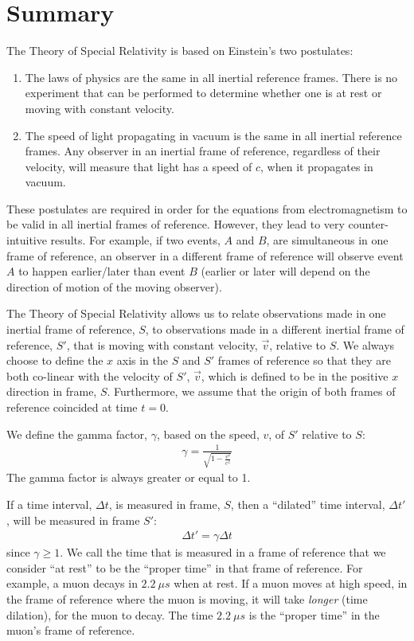 \section{Summary}
\vspace{2cm}
\begin{chapterSummary}
The Theory of Special Relativity is based on Einstein's two postulates:
\begin{enumerate}
\item The laws of physics are the same in all inertial reference frames. There is no experiment that can be performed to determine whether one is at rest or moving with constant velocity.
\item The speed of light propagating in vacuum is the same in all inertial reference frames. Any observer in an inertial frame of reference, regardless of their velocity, will measure that light has a speed of $c$, when it propagates in vacuum. 
\end{enumerate}
These postulates are required in order for the equations from electromagnetism to be valid in all inertial frames of reference. However, they lead to very counter-intuitive results. For example, if two events, $A$ and $B$, are simultaneous in one frame of reference, an observer in a different frame of reference will observe event $A$ to happen earlier/later than event $B$ (earlier or later will depend on the direction of motion of the moving observer).  

The Theory of Special Relativity allows us to relate observations made in one inertial frame of reference, $S$, to observations made in a different inertial frame of reference, $S'$, that is moving with constant velocity, $\vec v$, relative to $S$. We always choose to define the $x$ axis in the $S$ and $S'$ frames of reference so that they are both co-linear with the velocity of $S'$, $\vec v$, which is defined to be in the positive $x$ direction in frame, $S$. Furthermore, we assume that the origin of both frames of reference coincided at time $t=0$.

We define the gamma factor, $\gamma$, based on the speed, $v$, of $S'$ relative to $S$:
\begin{align*}
\gamma = \frac{1}{\sqrt{1-\frac{v^2}{c^2}}}
\end{align*}
The gamma factor is always greater or equal to 1. 

If a time interval, $\Delta t$, is measured in frame, $S$, then a ``dilated'' time interval, $\Delta t'$, will be measured in frame $S'$:
\begin{align*}
\Delta t'=\gamma \Delta t
\end{align*}
since $\gamma \geq 1$. We call the time that is measured in a frame of reference that we consider ``at rest'' to be the ``proper time'' in that frame of reference. For example, a muon decays in $\SI{2.2}{\mu s}$ when at rest. If a muon moves at high speed, in the frame of reference where the muon is moving, it will take \textit{longer} (time dilation), for the muon to decay. The time $\SI{2.2}{\mu s}$ is the ``proper time'' in the muon's frame of reference.


\end{chapterSummary}
